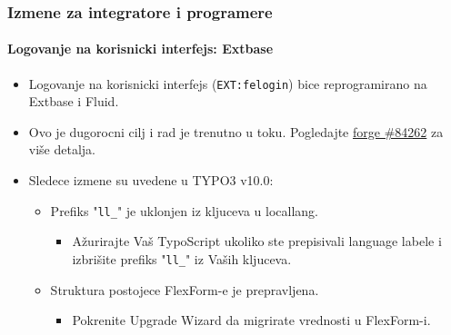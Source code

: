 \begin{frame}[fragile]
	\frametitle{Izmene za integratore i programere}
	\framesubtitle{Logovanje na korisnicki interfejs: Extbase}

	\begin{itemize}
		\item Logovanje na korisnicki interfejs (\texttt{EXT:felogin}) bice reprogramirano na Extbase i Fluid.

		\item Ovo je dugorocni cilj i rad je trenutno u toku.\newline
			Pogledajte \href{https://forge.typo3.org/issues/84262}{forge \#84262} za više detalja.

		\item Sledece izmene su uvedene u TYPO3 v10.0:

		\begin{itemize}
			\item[\ding{202}] Prefiks "\texttt{ll\_}" je uklonjen iz kljuceva u locallang.

				\begin{itemize}
					\item[\ding{228}] Ažurirajte Vaš TypoScript ukoliko ste prepisivali language labele
					i izbrišite prefiks "\texttt{ll\_}" iz Vaših kljuceva.
				\end{itemize}

			\item[\ding{203}] Struktura postojece FlexForm-e je prepravljena.

				\begin{itemize}
					\item[\ding{228}] Pokrenite Upgrade Wizard da migrirate vrednosti u FlexForm-i.
				\end{itemize}

		\end{itemize}

	\end{itemize}

\end{frame}



